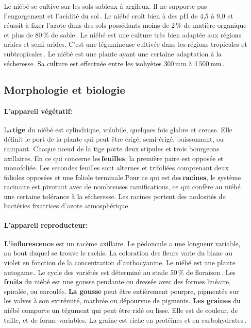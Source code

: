 \documentclass[a4paper,11pt]{article}
\begin{document}
 Le niébé se cultive sur les sols sableux à argileux. Il ne supporte
 pas l'engorgement et l'acidité du sol\,\cite{Doggett_1988}. Le niébé
 croît bien à des pH de 4,5 à 9,0 et réussit à fixer l'azote dans des
 sols possédants moins de 2\,\% de matière organique et plus de 80\,\% de
 sable\,\cite{SINGH_1997}. Le niébé est une culture très bien adaptée
 aux régions arides et semi-arides. C'est une légumineuse cultivée
 dans les régions tropicales et subtropicales\,\cite{Doggett_1988}. Le
 niébé est une plante ayant une certaine adaptation à la
 sécheresse. Sa culture est effectuée entre les isohyètes 300\,mm à
 1\,500\,mm\,\cite{Doggett_1988}.

\subsection{Morphologie et biologie}

  
\paragraph{L'appareil végétatif:}

La\,\textbf{tige} du niébé est cylindrique, volubile, quelques fois
glabre et creuse. Elle définit le port de la plante qui peut être
érigé, semi-érigé, buissonnant, ou rampant. Chaque nœud de la tige
porte deux stipules et trois bourgeons axillaires. En ce qui concerne
les\,\textbf{feuilles}, la première paire est opposée et
monofoliée. Les secondes feuilles sont alternes et trifoliées
comprenant deux folioles opposées et une foliole terminale.Pour ce qui
est des\,\textbf{racines}, le système racinaire est pivotant avec
de nombreuses ramifications, ce qui confère au niébé une certaine
tolérance à la sécheresse. Les racines portent des nodosités de
bactéries fixatrices d'azote atmosphérique\,\cite{Doggett_1988}.



\paragraph{L'appareil reproducteur:}

\textbf{L'inflorescence} est un racème axillaire. Le pédoncule a une
longueur variable, au bout duquel se trouve le rachis. La coloration
des fleurs varie du blanc au violet en fonction de la concentration
d'anthocyanine. Le niébé est une plante autogame\,\cite{Fery}. Le
cycle des variétés est déterminé au stade 50\,\% de
floraison\,\cite{Drabo_1981}. Les\,\textbf{fruits} du niébé est une
gousse pendante ou dressée avec des formes linéaire, spiralée, ou
enroulée. \textbf{La gousse} peut être entièrement pourpre, pigmentée
sur les valves à son extrémité, marbrée ou dépourvue de
pigments. \textbf{Les graines} du niébé comporte un tégument qui peut
être ridé ou lisse. Elle est de couleur, de taille, et de forme
variables. La graine est riche en protéines et en
carbohydrates\,\cite{Doggett_1988}.
\end{document}
